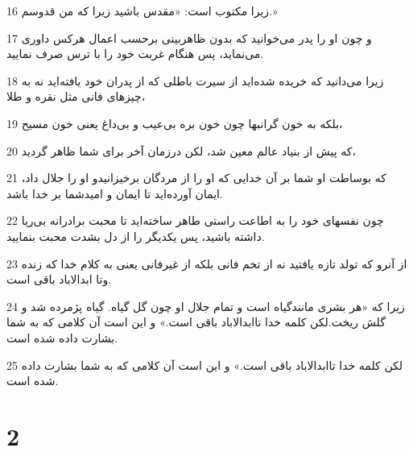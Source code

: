 \par 16 زیرا مکتوب است: «مقدس باشید زیرا که من قدوسم.»
\par 17 و چون او را پدر می‌خوانید که بدون ظاهربینی برحسب اعمال هرکس داوری می‌نماید، پس هنگام غربت خود را با ترس صرف نمایید.
\par 18 زیرا می‌دانید که خریده شده‌اید از سیرت باطلی که از پدران خود یافته‌اید نه به چیزهای فانی مثل نقره و طلا،
\par 19 بلکه به خون گرانبها چون خون بره بی‌عیب و بی‌داغ یعنی خون مسیح،
\par 20 که پیش از بنیاد عالم معین شد، لکن درزمان آخر برای شما ظاهر گردید،
\par 21 که بوساطت او شما بر آن خدایی که او را از مردگان برخیزانیدو او را جلال داد، ایمان آورده‌اید تا ایمان و امیدشما بر خدا باشد.
\par 22 چون نفسهای خود را به اطاعت راستی طاهر ساخته‌اید تا محبت برادرانه بی‌ریا داشته باشید، پس یکدیگر را از دل بشدت محبت بنمایید.
\par 23 از آنرو که تولد تازه یافتید نه از تخم فانی بلکه از غیرفانی یعنی به کلام خدا که زنده وتا ابدالاباد باقی است.
\par 24 زیرا که «هر بشری مانندگیاه است و تمام جلال او چون گل گیاه. گیاه پژمرده شد و گلش ریخت.لکن کلمه خدا تاابدالاباد باقی است.» و این است آن کلامی که به شما بشارت داده شده است.
\par 25 لکن کلمه خدا تاابدالاباد باقی است.» و این است آن کلامی که به شما بشارت داده شده است.

\chapter{2}

